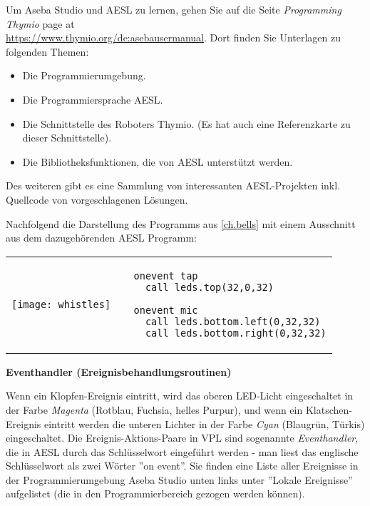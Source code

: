 Um Aseba Studio und AESL zu lernen, gehen Sie auf die Seite \emph{Programming
Thymio} page at\\
\href{https://www.thymio.org/de:asebausermanual}{https://www.thymio.org/de:asebausermanual}.
Dort finden Sie Unterlagen zu folgenden Themen:

\begin{itemize}
\item Die Programmierumgebung.
\item Die Programmiersprache AESL.
\item Die Schnittstelle des Roboters Thymio.
(Es hat auch eine Referenzkarte zu dieser Schnittstelle).
\item Die Bibliotheksfunktionen, die von AESL unterstützt werden.
\end{itemize}

Des weiteren gibt es eine Sammlung von interessanten AESL-Projekten inkl. Quellcode von vorgeschlagenen Lösungen.


Nachfolgend die Darstellung des Programms  aus \cref{ch.bells} mit einem Ausschnitt aus dem dazugehörenden AESL Programm:
 
\begin{center}
\begin{tabular}{ll}
\texttt{[image: whistles]} &
\begin{minipage}[b]{.5\textwidth}
\begin{footnotesize}
\begin{verbatim}
  onevent tap
    call leds.top(32,0,32)
  
  onevent mic
    call leds.bottom.left(0,32,32)
    call leds.bottom.right(0,32,32)
\end{verbatim}
\end{footnotesize}
\vspace*{8ex}
\end{minipage}
\end{tabular}
\end{center}

\textbf{\large Eventhandler (Ereignisbehandlungsroutinen)}

Wenn ein Klopfen-Ereignis eintritt, wird das oberen LED-Licht eingeschaltet in der Farbe \emph{Magenta} (Rotblau, Fuchsia, helles Purpur), und wenn ein Klatschen-Ereignis eintritt werden die unteren Lichter in der Farbe \emph{Cyan} (Blaugrün, Türkis) eingeschaltet. Die Ereignis-Aktions-Paare in VPL sind sogenannte \emph{Eventhandler}, die in AESL durch das Schlüsselwort  eingeführt werden - man liest das englische Schlüsselwort als zwei Wörter ''on event''. Sie finden eine Liste aller Ereignisse in der Programmierumgebung Aseba Studio unten links unter ''Lokale Ereignisse'' aufgelistet (die in den Programmierbereich gezogen werden können).

